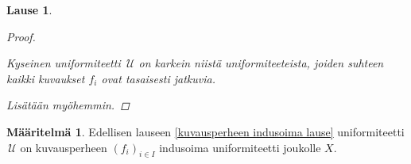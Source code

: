 \documentclass[12pt,a4paper,leqno]{report}
\newcommand{\N}{\mathbb{N}}
\newcommand{\U}{\,\mathcal{U}}
\theoremstyle{plain}
\newtheorem{lause}[equation]{Lause}
\theoremstyle{definition}
\newtheorem{maar}[equation]{Määritelmä}
\theoremstyle{remark}
\begin{document}
\begin{lause}
\begin{proof}
\begin{enumerate}
%
%
%
%
%
%
\end{enumerate}
Kyseinen uniformiteetti $\U$ on karkein niistä uniformiteeteista, 
joiden suhteen kaikki kuvaukset $f_i$ ovat tasaisesti jatkuvia.

Lisätään myöhemmin. %
\end{proof}
\end{lause}
\begin{maar}\label{kuvausperheen indusoima}
Edellisen lauseen \ref{kuvausperheen indusoima lause} uniformiteetti $\U$ on kuvausperheen $(f_i)_{i\in I}$ indusoima uniformiteetti joukolle $X$.
\end{maar}
\end{document}
